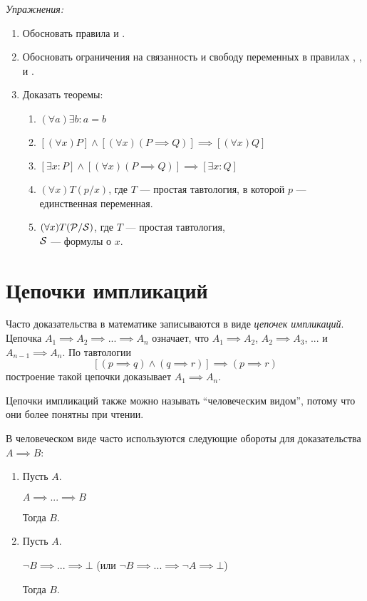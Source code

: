 \vspace{1em}
{\it Упражнения:}
\begin{enumerate}
	\item{}Обосновать правила \Eii{} и \Eee{}.
	\item{}Обосновать ограничения на связанность и свободу переменных в правилах
	\Aii{}, \Aee{}, \Eii{} и \Eee{}.
	\pagebreak
	\item{}\label{ex:obv_thm}Доказать теоремы:
	\begin{fullwidth}
		\begin{multicols}{2}
			\begin{enumerate}
				\item{}$(\forall a)\exists b:a=b$
				\item{}$[(\forall x)P]\land[(\forall x)(P\implies Q)]
					\implies [(\forall x)Q]$\label{thm:obv_forall}
				\item{}$[\exists x:P]\land[(\forall x)(P\implies Q)]
					\implies [\exists x:Q]$
				\item{}$(\forall x)T(p/x)$, где $T$ --- простая тавтология,
				в которой $p$ --- единственная переменная.
				\item{}$(\forall x)T(\mathcal P/\mathcal S)$, где $T$ --- простая тавтология,\\
				$\mathcal S$ --- формулы о $x$.\label{thm:obv_taut}
			\end{enumerate}
		\end{multicols}
	\end{fullwidth}
\end{enumerate}

\section{Цепочки импликаций}

Часто доказательства в математике записываются в виде {\it цепочек импликаций}.
Цепочка $A_1\implies A_2\implies...\implies A_{n}$ означает, что $A_1\implies A_2$,
$A_2\implies A_3$, ... и $A_{n-1}\implies A_{n}$.
По тавтологии
\[
	[(p\implies q)\land (q\implies r)]\implies (p\implies r)
\]
построение такой цепочки доказывает $A_1\implies A_{n}$.

Цепочки импликаций также можно называть ``человеческим видом'', потому что они более
понятны при чтении.

В человеческом виде часто используются следующие обороты
для доказательства $A\implies B$:
\begin{enumerate}
	\item{}
	Пусть $A$.

	$A\implies ...\implies B$

	Тогда $B$.
	\item{}
	Пусть $A$.

	$\lnot B\implies ...\implies \bot$
	(или $\lnot B\implies ...\implies \lnot A\implies\bot$)

	Тогда $B$.
\end{enumerate}

